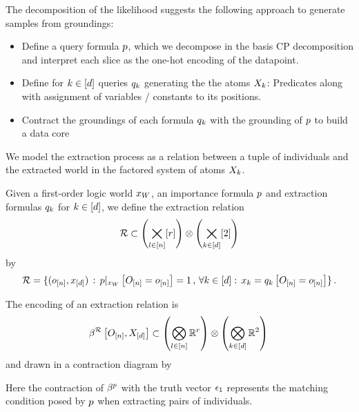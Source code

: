 
The decomposition of the likelihood suggests the following approach to generate samples from groundings:
\begin{itemize}
    \item Define a query formula $p$, which we decompose in the basis CP decomposition and interpret each slice as the one-hot encoding of the datapoint.
    \item Define for $k\in[d]$ queries $q_{k}$ generating the the atoms $X_{k}$:
    Predicates along with assignment of variables / constants to its positions.
    \item Contract the groundings of each formula $q_{k}$ with the grounding of $p$ to build a data core
\end{itemize}



We model the extraction process as a relation between a tuple of individuals and the extracted world in the factored system of atoms $X_{k}$.

\begin{definition}
    \label{def:extractionRelation}
    Given a first-order logic world $x_{W}$, an importance formula $p$ and extraction formulas $q_{k}$ for $k\in[d]$, we define the extraction relation
    \begin{align*}
        \mathcal{R} \subset \left(\bigtimes_{l\in[n]}[r]\right) \otimes \left(\bigtimes_{k\in[d]}[2]\right)
    \end{align*}
    by
    \begin{align*}
        \mathcal{R}
        = \{ (o_{[n]}, x_{[d]})
        \, : \,  {p}|_{x_{W}} \left[O_{[n]}=o_{[n]}\right] = 1 \, , \, \forall {k\in[d]} : \,  x_{k} = q_{k}\left[O_{[n]}=o_{[n]}\right] \} \, .
    \end{align*}
\end{definition}

The encoding of an extraction relation is
\begin{align*}
    \beta^{\mathcal{R}}\left[O_{[n]},X_{[d]}\right] \subset \left(\bigotimes_{l\in[n]}\mathbb{R}^{r}\right) \otimes \left(\bigotimes_{k\in[d]}\mathbb{R}^2\right) \,
\end{align*}
and drawn in a contraction diagram by
\begin{center}
    
\end{center}
Here the contraction of $\beta^{p}$ with the truth vector $\epsilon_1$ represents the matching condition posed by $p$ when extracting pairs of individuals.


